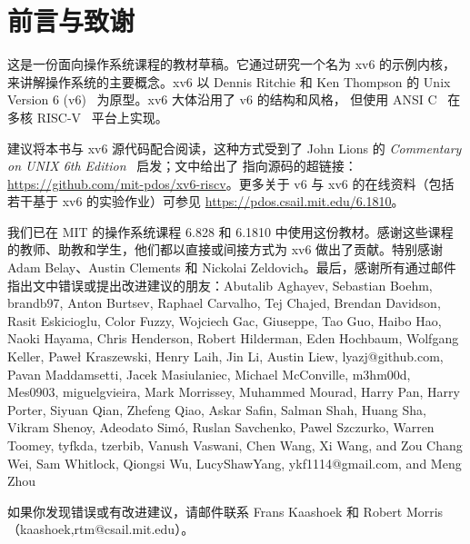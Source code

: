 \chapter*{前言与致谢}


这是一份面向操作系统课程的教材草稿。它通过研究一个名为 xv6 的示例内核，
来讲解操作系统的主要概念。xv6 以 Dennis Ritchie 和 Ken Thompson 的
Unix Version 6 (v6)~\cite{unix} 为原型。xv6 大体沿用了 v6 的结构和风格，
但使用 ANSI C~\cite{kernighan} 在多核 RISC-V~\cite{riscv} 平台上实现。

建议将本书与 xv6 源代码配合阅读，这种方式受到了 John Lions 的
\textit{Commentary on UNIX 6th Edition}~\cite{lions} 启发；文中给出了
指向源码的超链接：\url{https://github.com/mit-pdos/xv6-riscv}。更多关于
v6 与 xv6 的在线资料（包括若干基于 xv6 的实验作业）可参见
\url{https://pdos.csail.mit.edu/6.1810}。

我们已在 MIT 的操作系统课程 6.828 和 6.1810 中使用这份教材。感谢这些课程
的教师、助教和学生，他们都以直接或间接方式为 xv6 做出了贡献。特别感谢
Adam Belay、Austin Clements 和 Nickolai Zeldovich。最后，感谢所有通过邮件
指出文中错误或提出改进建议的朋友：Abutalib Aghayev, Sebastian Boehm, brandb97,
Anton Burtsev, Raphael Carvalho, Tej Chajed, Brendan Davidson, Rasit Eskicioglu,
Color Fuzzy, Wojciech Gac, Giuseppe, Tao Guo, Haibo Hao, Naoki Hayama, Chris
Henderson, Robert Hilderman, Eden Hochbaum, Wolfgang Keller, Paweł Kraszewski,
Henry Laih, Jin Li, Austin Liew, lyazj@github.com, Pavan Maddamsetti, Jacek
Masiulaniec, Michael McConville, m3hm00d, Mes0903, miguelgvieira, Mark Morrissey,
Muhammed Mourad, Harry Pan, Harry Porter, Siyuan Qian, Zhefeng Qiao, Askar Safin,
Salman Shah, Huang Sha, Vikram Shenoy, Adeodato Simó, Ruslan Savchenko, Pawel
Szczurko, Warren Toomey, tyfkda, tzerbib, Vanush Vaswani, Chen Wang, Xi Wang, and
Zou Chang Wei, Sam Whitlock, Qiongsi Wu, LucyShawYang, ykf1114@gmail.com, and
Meng Zhou

如果你发现错误或有改进建议，请邮件联系 Frans Kaashoek 和 Robert Morris
（kaashoek,rtm@csail.mit.edu）。
